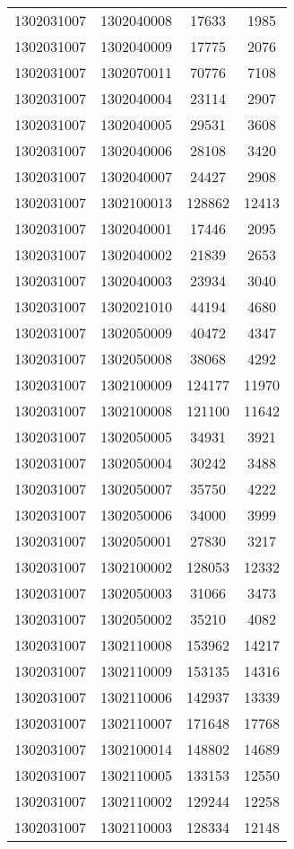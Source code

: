 \begin{longtable}[h]{llcc}
		1302031007 & 1302040008 & 17633 & 1985\\
		1302031007 & 1302040009 & 17775 & 2076\\
		1302031007 & 1302070011 & 70776 & 7108\\
		1302031007 & 1302040004 & 23114 & 2907\\
		1302031007 & 1302040005 & 29531 & 3608\\
		1302031007 & 1302040006 & 28108 & 3420\\
		1302031007 & 1302040007 & 24427 & 2908\\
		1302031007 & 1302100013 & 128862 & 12413\\
		1302031007 & 1302040001 & 17446 & 2095\\
		1302031007 & 1302040002 & 21839 & 2653\\
		1302031007 & 1302040003 & 23934 & 3040\\
		1302031007 & 1302021010 & 44194 & 4680\\
		1302031007 & 1302050009 & 40472 & 4347\\
		1302031007 & 1302050008 & 38068 & 4292\\
		1302031007 & 1302100009 & 124177 & 11970\\
		1302031007 & 1302100008 & 121100 & 11642\\
		1302031007 & 1302050005 & 34931 & 3921\\
		1302031007 & 1302050004 & 30242 & 3488\\
		1302031007 & 1302050007 & 35750 & 4222\\
		1302031007 & 1302050006 & 34000 & 3999\\
		1302031007 & 1302050001 & 27830 & 3217\\
		1302031007 & 1302100002 & 128053 & 12332\\
		1302031007 & 1302050003 & 31066 & 3473\\
		1302031007 & 1302050002 & 35210 & 4082\\
		1302031007 & 1302110008 & 153962 & 14217\\
		1302031007 & 1302110009 & 153135 & 14316\\
		1302031007 & 1302110006 & 142937 & 13339\\
		1302031007 & 1302110007 & 171648 & 17768\\
		1302031007 & 1302100014 & 148802 & 14689\\
		1302031007 & 1302110005 & 133153 & 12550\\
		1302031007 & 1302110002 & 129244 & 12258\\
		1302031007 & 1302110003 & 128334 & 12148\\

\end{longtable}
